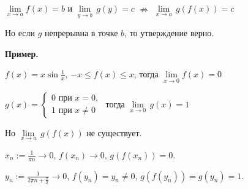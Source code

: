 $\underset{x \rightarrow a}{\lim} f(x) = b$ и
$\underset{y \rightarrow b}{\lim} \, g(y) = c$ $\nRightarrow$ 
$\underset{x \rightarrow a}{\lim} \, g(f(x)) = c$

\notice Но если $g$ непрерывна в точке $b$, то утверждение верно.

\textbf{Пример.}

$f(x) = x \sin \frac 1 x$, $-x \leqslant f(x) \leqslant x$, тогда
$\underset{x \rightarrow 0}{\lim} f(x) = 0$

$g(x) = \begin{cases}
    0 \text{ при } x = 0, \\
    1 \text{ при } x \neq 0
\end{cases}$ тогда $\underset{x \rightarrow 0}{\lim} \, g(x) = 1$

Но $\underset{x \rightarrow a}{\lim} \, g(f(x))$ не существует.

$x_n := \frac {1}{\pi n} \rightarrow 0$, $f(x_n) \rightarrow 0$,
$g(f(x_n)) = 0$.

$y_n := \frac{1}{2 \pi n + \frac{\pi}{2}} \rightarrow 0$,
$f(y_n) = y_n \neq 0$, $g(f(y_n)) = g(y_n) = 1$.
